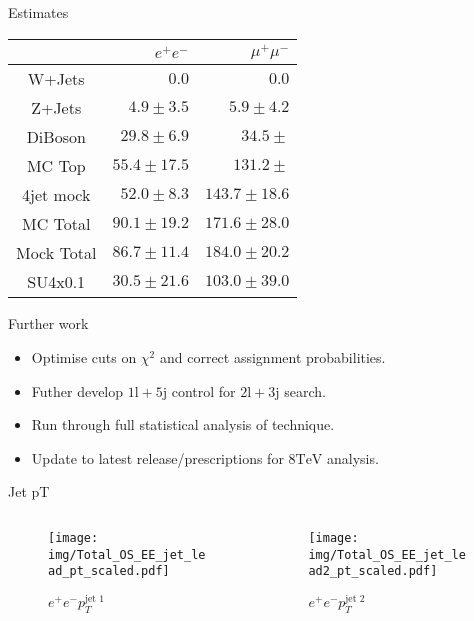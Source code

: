 \documentclass{beamer}
\begin{document}
\begin{frame}{Estimates}
\begin{table}
\centering
\begin{tabular}{c||r|r}
                     & $e^+e^- $ & $\mu^+\mu^-$ \\
\hline \hline
W+Jets    & $0.0$         & $0.0$ \\
Z+Jets    & $4.9\pm3.5$   & $5.9\pm4.2$ \\
DiBoson   & $29.8\pm6.9$  & $34.5\pm$ \\
MC Top    & $55.4\pm17.5$ & $131.2\pm$ \\
4jet mock & $52.0\pm8.3$  & $143.7\pm18.6$ \\
\hline
MC Total  & $90.1\pm19.2$ & $171.6\pm28.0$ \\
Mock Total& $86.7\pm11.4$ & $184.0\pm20.2$ \\
\hline
SU4x0.1   & $30.5\pm21.6$ & $103.0\pm39.0$ \\
\hline
\end{tabular}
\label{tab:myfirsttable}
\end{table}
\end{frame}

\begin{frame}{Further work}
  \begin{itemize}
    \item Optimise cuts on $\chi^2$ and correct assignment probabilities.
    \item Futher develop $1\text{l}+5\text{j}$ control for $2\text{l}+3\text{j}$ search.
    \item Run through full statistical analysis of technique.
    \item Update to latest release/prescriptions for $8\text{TeV}$ analysis.
  \end{itemize}
\end{frame}


\begin{frame}{Jet pT}
  \begin{columns}
    \begin{column}{0.45\textwidth}\begin{figure}
      \caption{$e^{+}e^{-}p_{T}^{\text{jet 1}}$}
      \texttt{[image: img/Total\_OS\_EE\_jet\_lead\_pt\_scaled.pdf]}
    \end{figure}\end{column}
    \begin{column}{0.45\textwidth}\begin{figure}
      \caption{$e^{+}e^{-}p_{T}^{\text{jet 2}}$}
      \texttt{[image: img/Total\_OS\_EE\_jet\_lead2\_pt\_scaled.pdf]}
    \end{figure}\end{column}
  \end{columns}
\end{frame}
\end{document}

